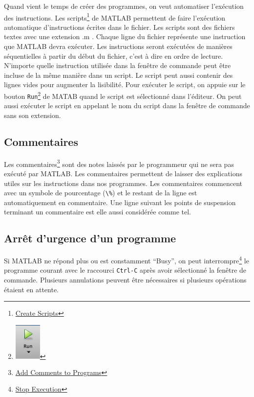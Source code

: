 \documentclass[]{tufte-handout}
\newcommand{\passthrough}[1]{#1}
\begin{document}
Quand vient le temps de créer des programmes, on veut automatiser
l'exécution des instructions. Les scripts\footnote{\href{https://www.mathworks.com/help/matlab/matlab_prog/create-scripts.html}{Create
  Scripts}} de MATLAB permettent de faire l'exécution automatique
d'instructions écrites dans le fichier. Les scripts sont des fichiers
textes avec une extension .m . Chaque ligne du fichier représente une
instruction que MATLAB devra exécuter. Les instructions seront exécutées
de manières séquentielles à partir du début du fichier, c'est à dire en
ordre de lecture. N'importe quelle instruction utilisée dans la fenêtre
de commande peut être incluse de la même manière dans un script. Le
script peut aussi contenir des lignes vides pour augmenter la
lisibilité. Pour exécuter le script, on appuie sur le bouton
\passthrough{\lstinline!Run!}\footnote{\includegraphics[width=0.52083in,height=\textheight]{run-button.png}}
de MATAB quand le script est sélectionné dans l'éditeur. On peut aussi
exécuter le script en appelant le nom du script dans la fenêtre de
commande sans son extension.

\hypertarget{commentaires}{%
\subsection{Commentaires}\label{commentaires}}

Les commentaires\footnote{\href{https://www.mathworks.com/help/matlab/matlab_prog/comments.html}{Add
  Comments to Programs}} sont des notes laissés par le programmeur qui
ne sera pas exécuté par MATLAB. Les commentaires permettent de laisser
des explications utiles sur les instructions dans nos programmes. Les
commentaires commencent avec un symbole de pourcentage
(\passthrough{\lstinline!\%!}) et le restant de la ligne est
automatiquement en commentaire. Une ligne suivant les points de
suspension terminant un commentaire est elle aussi considérée comme tel.

\hypertarget{arruxeat-durgence-dun-programme}{%
\subsection{Arrêt d'urgence d'un
programme}\label{arruxeat-durgence-dun-programme}}

Si MATLAB ne répond plus ou est constamment ``Busy'', on peut
interrompre\footnote{\href{https://www.mathworks.com/help/matlab/matlab_env/stop-execution.html}{Stop
  Execution}} le programme courant avec le raccourci
\passthrough{\lstinline!Ctrl-C!} après avoir sélectionné la fenêtre de
commande. Plusieurs annulations peuvent être nécessaires si plusieurs
opérations étaient en attente.
\end{document}
